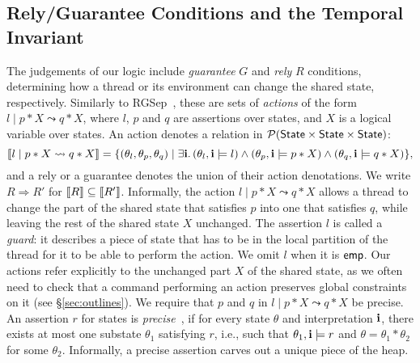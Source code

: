 


\subsection{Rely/Guarantee Conditions and the Temporal Invariant\label{sec:rely}}

The judgements of our logic include {\em guarantee} $G$ and {\em rely} $R$
conditions, determining how a thread or its environment can change the shared
state, respectively. Similarly to RGSep~\cite{rgsep}, these are sets of
\emph{actions} of the form $l \mid p * X \leadsto q * X$, where $l$, $p$ and
$q$ are assertions over states, and $X$ is a logical variable over
states.  An action denotes a relation in $\mathcal{P}({\sf State} \times {\sf State} \times {\sf State})$:
$$
\llbracket l \mid p * X \leadsto q * X \rrbracket = 
\{(\theta_l, \theta_p, \theta_q) \mid 
\exists {\bf i}.\,
(\theta_l, {\bf i} \models l) \land
(\theta_p, {\bf i} \models p * X) \land
(\theta_q, {\bf i} \models q * X)\},
$$
and a rely or a guarantee denotes the union of their action denotations. We
write $R \Rightarrow R'$ for $\llbracket R \rrbracket \subseteq \llbracket R' \rrbracket$.
Informally, the action $l \mid p * X \leadsto q * X$ allows a thread to change
the part of the shared state that satisfies $p$ into one that satisfies $q$,
while leaving the rest of the shared state $X$ unchanged.  The assertion $l$ is
called a {\em guard}: it describes a piece of state that has to be in the local
partition of the thread for it to be able to perform the action. 
We omit $l$ when it is $\mathsf{emp}$.
Our actions refer explicitly to the
unchanged part $X$ of the shared state, as we
often need to check that a command performing an action preserves global
constraints on it (see \S\ref{sec:outlines}).
We require that $p$ and $q$ in $l \mid p * X \leadsto q
* X$ be precise. An assertion $r$ for states is {\em
  precise}~\cite{seplogic-concurrent}, if for every state $\theta$ and
interpretation ${\bf i}$, there exists at most one substate $\theta_1$ satisfying
$r$, i.e., such that $\theta_1, {\bf i} \models r$ and $\theta = \theta_1 *
\theta_2$ for some $\theta_2$. Informally, a precise assertion carves out a
unique piece of the heap.


